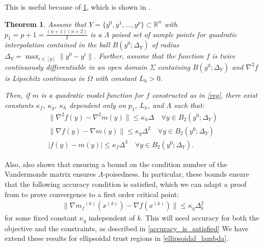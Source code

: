 \documentclass{article}
\newtheorem{theorem}{Theorem}[section]
\theoremstyle{case}
\numberwithin{theorem}{subsection}
\newcommand{\dk}{\Delta_k}
\newcommand{\gradf}{\nabla f}
\newcommand{\mfk}{{{m}_f}^{(k)}}
\newcommand{\reals}{\mathbb R}
\newcommand{\Rn}{\mathbb R^n}
\newcommand{\xk}{x^{(k)}}
\begin{document}

This is useful because of \cref{quadratic_errors}, which is shown in \cite{introduction_book}.

\begin{theorem}
\label{quadratic_errors}
Assume that $Y = \{y^0, y^1, \ldots, y^p\} \subset \Rn$ with $p_1 = p+1= \frac{(n+1)(n+2)}{2}$ is a $\Lambda$
poised set of sample points for quadratic interpolation contained in the ball $B(y^0; \Delta_Y)$ of radius $\Delta_Y = \max_{i \in [p]} \|y^0 - y^i\|$.
Further, assume that the function $f$ is twice continuously differentiable in an open domain $\Sigma$ containing $B(y^0; \Delta_Y)$ and $\nabla^2 f$
is Lipschitz continuous in $\Omega$ with constant $L_h > 0$.

Then, if $m$ is a quadratic model function for $f$ constructed as in \cref{reg}, there exist constants $\kappa_f$, $\kappa_g$, $\kappa_h$ dependent only on $p_1$, $L_h$, and $\Lambda$ such that:
\begin{align}
\|\nabla^2 f(y) - \nabla^2 m(y)\| \le \kappa_{h} \Delta \quad \forall y \in B_2(y^0; \Delta_Y) \label{error_in_hessian}\\
\|\gradf(y) - \nabla m(y)\| \le \kappa_{g} \Delta^2 \quad \forall y \in B_2(y^0; \Delta_Y) \label{error_in_gradient} \\
|f(y) - m(y) | \le \kappa_{f} \Delta^3 \quad \forall y \in B_2(y^0; \Delta_Y). \label{error_in_function} 
\end{align}
\end{theorem}


Also, \cite{introduction_book} also shows that ensuring a bound on the condition number of the Vandermonde matrix ensures $\Lambda$-poisedness.
In particular, these bounds ensure that the following accuracy condition is satisfied, which we can adapt a proof from \cite{Conejo:2013:GCT:2620806.2621814} to prove convergence to a first order critical point: 
\begin{align}
\label{accuracy}
\|\nabla \mfk(\xk) - \gradf(\xk) \| \le \kappa_g \dk^2
\end{align}
for some fixed constant $\kappa_g$ independent of $k$.
This will need accuracy for both the objective and the constraints, as described in \cref{accuracy_is_satisfied}
We have extend these results for ellipsoidal trust regions in \cref{ellipsoidal_lambda}.
 
\end{document}
